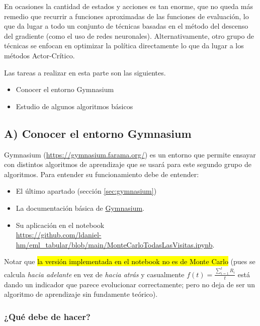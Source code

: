 \documentclass[a4paper, 11pt]{article}
\newcommand\nuevo[1]{\hl{#1}}
\begin{document}
En ocasiones la cantidad de estados y acciones es tan enorme, que no queda más remedio que recurrir a funciones aproximadas de las funciones de evaluación, lo que da lugar a todo un conjunto de técnicas basadas en el método del descenso del gradiente (como el uso de redes neuronales). Alternativamente, otro grupo de técnicas se enfocan en optimizar la política directamente lo que da lugar a los métodos Actor-Crítico.


Las tareas a realizar en esta parte son las siguientes.

\begin{itemize}
\item Conocer el entorno Gymnasium
\item Estudio de algunos algoritmos básicos
\end{itemize}


\subsection*{A) Conocer el entorno Gymnasium}

Gymnasium (\url{https://gymnasium.farama.org/}) es un entorno que permite ensayar con distintos algoritmos de aprendizaje que se usará para este segundo grupo de algoritmos. Para entender su funcionamiento debe de entender:

\begin{itemize}
\item El último apartado (sección \ref{sec:gymnasium})
\item La documentación básica de \href{https://gymnasium.farama.org/}{Gymnasium}. 
\item Su aplicación en el notebook \\
\url{https://github.com/ldaniel-hm/eml_tabular/blob/main/MonteCarloTodasLasVisitas.ipynb}.
\end{itemize}

Notar que \nuevo{la versión implementada en el notebook no es de Monte Carlo} (pues se calcula \textit{hacia adelante} en vez de \textit{hacia atrás} y casualmente $f(t)=\frac{\sum_{i=1}^t R_i}{t}$ está dando un indicador que parece evolucionar correctamente; pero no deja de ser un algoritmo de aprendizaje sin fundamente teórico).

\subsubsection*{¿Qué debe de hacer?}
\end{document}
